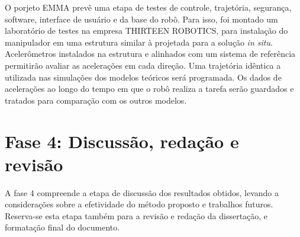 O porjeto EMMA prevê uma etapa de testes de controle, trajetória, segurança,
software, interface de usuário e da base do robô. Para isso, foi montado um
laboratório de testes na empresa THIRTEEN ROBOTICS, para instalação do
manipulador em uma estrutura similar à projetada para a solução
\textit{in situ}.
Acelerômetros instalados na estrutura e alinhados com um sistema de referência
permitirão avaliar as acelerações em cada direção.
Uma trajetória idêntica a utilizada nas simulações dos modelos teóricos será
programada. Os dados de acelerações ao longo do tempo em que o robô realiza a
tarefa serão guardados e tratados para comparação com os outros
modelos.

\section{Fase 4: Discussão, redação e revisão}

A fase 4 compreende a etapa de discussão dos resultados obtidos, levando a
considerações sobre a efetividade do método proposto e trabalhos futuros.
Reserva-se esta etapa também para a revisão e redação da dissertação, e
formatação final do documento.



